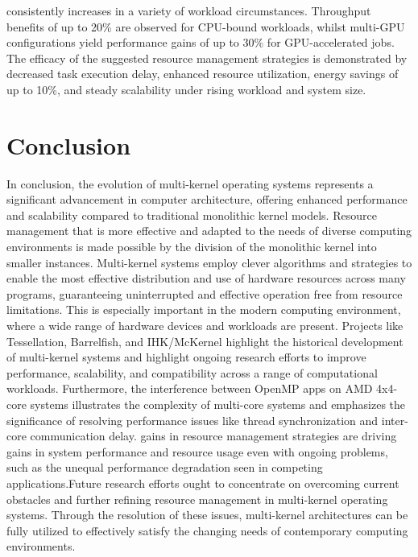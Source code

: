 \documentclass[16pt,a4paper]{article}
\begin{document}
consistently increases in a variety of workload circumstances. Throughput benefits of up to 20\% are observed for CPU-bound workloads, whilst multi-GPU configurations yield performance gains of up to 30\% for GPU-accelerated jobs. The efficacy of the suggested resource management strategies is demonstrated by decreased task execution delay, enhanced resource utilization, energy savings of up to 10\%, and steady scalability under rising workload and system size.
\clearpage
\section{Conclusion}
In conclusion, the evolution of multi-kernel operating systems represents a significant advancement in computer architecture, offering enhanced performance and scalability compared to traditional monolithic kernel models. Resource management that is more effective and adapted to the needs of diverse computing environments is made possible by the division of the monolithic kernel into smaller instances. Multi-kernel systems employ clever algorithms and strategies to enable the most effective distribution and use of hardware resources across many programs, guaranteeing uninterrupted and effective operation free from resource limitations. This is especially important in the modern computing environment, where a wide range of hardware devices and workloads are present. Projects like Tessellation, Barrelfish, and IHK/McKernel highlight the historical development of multi-kernel systems and highlight ongoing research efforts to improve performance, scalability, and compatibility across a range of computational workloads. Furthermore, the interference between OpenMP apps on AMD 4x4-core systems illustrates the complexity of multi-core systems and emphasizes the significance of resolving performance issues like thread synchronization and inter-core communication delay. gains in resource management strategies are driving gains in system performance and resource usage even with ongoing problems, such as the unequal performance degradation seen in competing applications.Future research efforts ought to concentrate on overcoming current obstacles and further refining resource management in multi-kernel operating systems. Through the resolution of these issues, multi-kernel architectures can be fully utilized to effectively satisfy the changing needs of contemporary computing environments.

\clearpage
\end{document}
